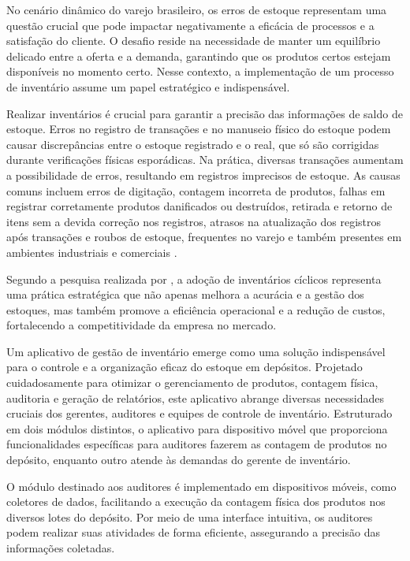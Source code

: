 
No cenário dinâmico do varejo brasileiro, os erros de estoque representam uma questão crucial que pode impactar negativamente a eficácia de processos e a satisfação do cliente. O desafio reside na necessidade de manter um equilíbrio delicado entre a oferta e a demanda, garantindo que os produtos certos estejam disponíveis no momento certo. Nesse contexto, a implementação de um processo de inventário assume um papel estratégico e indispensável.


Realizar inventários é crucial para garantir a precisão das informações de saldo de estoque. Erros no registro de transações e no manuseio físico do estoque podem causar discrepâncias entre o estoque registrado e o real, que só são corrigidas durante verificações físicas esporádicas. Na prática, diversas transações aumentam a possibilidade de erros, resultando em registros imprecisos de estoque. As causas comuns incluem erros de digitação, contagem incorreta de produtos, falhas em registrar corretamente produtos danificados ou destruídos, retirada e retorno de itens sem a devida correção nos registros, atrasos na atualização dos registros após transações e roubos de estoque, frequentes no varejo e também presentes em ambientes industriais e comerciais \cite{nigel}.

Segundo a pesquisa realizada por \cite{silva}, a adoção de inventários cíclicos representa uma prática estratégica que não apenas melhora a acurácia e a gestão dos estoques, mas também promove a eficiência operacional e a redução de custos, fortalecendo a competitividade da empresa no mercado.



Um aplicativo de gestão de inventário emerge como uma solução indispensável para o controle e a organização eficaz do estoque em depósitos. Projetado cuidadosamente para otimizar o gerenciamento de produtos, contagem física, auditoria e geração de relatórios, este aplicativo abrange diversas necessidades cruciais dos gerentes, auditores e equipes de controle de inventário. Estruturado em dois módulos distintos, o aplicativo para dispositivo móvel que proporciona funcionalidades específicas para auditores fazerem as contagem de produtos no depósito, enquanto outro atende às demandas do gerente de inventário.

O módulo destinado aos auditores é implementado em dispositivos móveis, como coletores de dados, facilitando a execução da contagem física dos produtos nos diversos lotes do depósito. Por meio de uma interface intuitiva, os auditores podem realizar suas atividades de forma eficiente, assegurando a precisão das informações coletadas.

